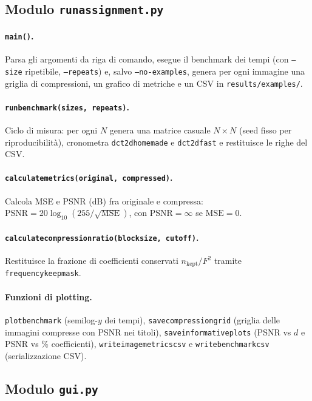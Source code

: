 \documentclass[11pt,a4paper]{article}
\makeatletter
\let\@origtexttt\texttt
\renewcommand{\texttt}[1]{{\def\_{\textunderscore\discretionary{}{}{}}\@origtexttt{#1}}}
\makeatother
\begin{document}
\subsection{Modulo \texttt{run\_assignment.py}}

\paragraph{\texttt{main()}.}
Parsa gli argomenti da riga di comando, esegue il benchmark dei tempi (con
\texttt{--size} ripetibile, \texttt{--repeats}) e, salvo \texttt{--no-examples},
genera per ogni immagine una griglia di compressioni, un grafico di metriche e
un CSV in \texttt{results/examples/}.

\paragraph{\texttt{run\_benchmark(sizes, repeats)}.}
Ciclo di misura: per ogni $N$ genera una matrice casuale $N\times N$ (seed
fisso per riproducibilità), cronometra \texttt{dct\_2d\_homemade} e
\texttt{dct\_2d\_fast} e restituisce le righe del CSV.

\paragraph{\texttt{calculate\_metrics(original, compressed)}.}
Calcola MSE e PSNR (dB) fra originale e compressa:
$\mathrm{PSNR}=20\log_{10}(255/\sqrt{\mathrm{MSE}})$, con $\mathrm{PSNR}=\infty$
se $\mathrm{MSE}=0$.

\paragraph{\texttt{calculate\_compression\_ratio(block\_size, cutoff)}.}
Restituisce la frazione di coefficienti conservati
$n_{\text{kept}}/F^2$ tramite \texttt{frequency\_keep\_mask}.

\paragraph{Funzioni di plotting.}
\texttt{plot\_benchmark} (semilog-$y$ dei tempi), \texttt{save\_compression\_grid}
(griglia delle immagini compresse con PSNR nei titoli),
\texttt{save\_informative\_plots} (PSNR vs $d$ e PSNR vs \% coefficienti),
\texttt{write\_image\_metrics\_csv} e \texttt{write\_benchmark\_csv}
(serializzazione CSV).

\subsection{Modulo \texttt{gui.py}}
\end{document}
